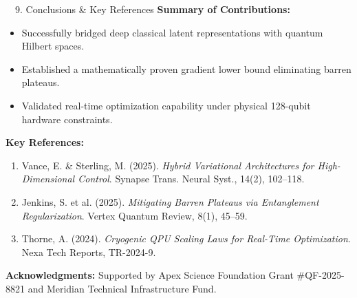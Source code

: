 \documentclass[a0,landscape]{a0poster}
\begin{document}
\begin{minipage}[t]{0.32\textwidth}
  \vspace{0.8cm}

  \begin{posterbox}{\faBookmark\ \ 9. Conclusions \& Key References}
    \textbf{Summary of Contributions:}
    \begin{itemize}
      \item Successfully bridged deep classical latent representations with quantum Hilbert spaces.
      \item Established a mathematically proven gradient lower bound eliminating barren plateaus.
      \item Validated real-time optimization capability under physical 128-qubit hardware constraints.
    \end{itemize}

    \vspace{0.3em}
    \small
    \textbf{Key References:}
    \begin{enumerate}[label=\lbrack\arabic*\rbrack, leftmargin=2em, itemsep=0.1em]
      \item Vance, E. \& Sterling, M. (2025). \textit{Hybrid Variational Architectures for High-Dimensional Control}. Synapse Trans. Neural Syst., 14(2), 102--118.
      \item Jenkins, S. et al. (2025). \textit{Mitigating Barren Plateaus via Entanglement Regularization}. Vertex Quantum Review, 8(1), 45--59.
      \item Thorne, A. (2024). \textit{Cryogenic QPU Scaling Laws for Real-Time Optimization}. Nexa Tech Reports, TR-2024-9.
    \end{enumerate}

    \vspace{0.3em}
    \begin{tcolorbox}[colback=PosterBG, colframe=PosterBorder, arc=2mm, boxrule=1pt, left=3mm, right=3mm, top=2mm, bottom=2mm]
      \footnotesize \textcolor{PosterDarkText}{\textbf{Acknowledgments:} Supported by Apex Science Foundation Grant \#QF-2025-8821 and Meridian Technical Infrastructure Fund.}
    \end{tcolorbox}
  \end{posterbox}

\end{minipage}
\end{document}
